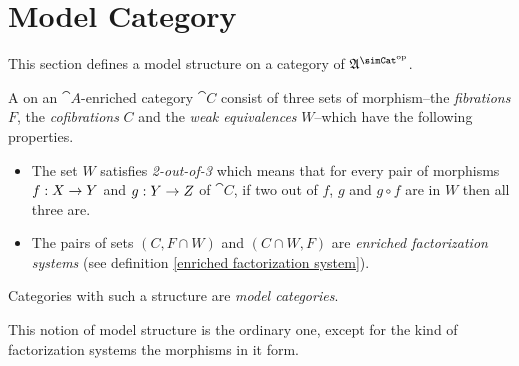 \documentclass[csh.tex]{subfiles}
\begin{document}
\section{Model Category}
This section defines a model structure on a category of $\ambient\s$.


\begin{definition} A  on an $\cat A$-enriched category $\cat C$ consist of three sets of morphism--the \emph{fibrations} $F$, the \emph{cofibrations} $C$ and the \emph{weak equivalences} $W$--which have the following properties. 
\begin{itemize}
\item The set $W$ satisfies \emph{2-out-of-3} which means that for every pair of morphisms $f: X\to Y$ and $g: Y\to Z$ of $\cat C$, if two out of $f$, $g$ and $g\circ f$ are in $W$ then all three are. 
\item The pairs of sets $(C,F\cap W)$ and $(C\cap W,F)$ are \emph{enriched factorization systems} (see definition \ref{enriched factorization system}). 
\end{itemize}

Categories with such a structure are \emph{model categories}.
\end{definition}

This notion of model structure is the ordinary one, except for the kind of factorization systems the morphisms in it form.
\end{document}
